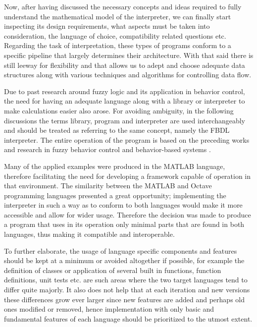 Now, after having discussed the necessary concepts and ideas required to fully understand the mathematical model of the interpreter, we can finally start inspecting its design requirements, what aspects must be taken into consideration, the language of choice, compatibility related questions etc. Regarding the task of interpretation, these types of programs conform to a specific pipeline that largely determines their architecture. With that said there is still leeway for flexibility and that allows us to adept and choose adequate data structures along with various techniques and algorithms for controlling data flow.

Due to past research around fuzzy logic and its application in behavior control, the need for having an adequate language along with a library or interpreter to make calculations easier also arose. For avoiding ambiguity, in the following discussions the terms library, program and interpreter are used interchangeably and should be treated as referring to the same concept, namely the FBDL interpreter. The entire operation of the program is based on the preceding works and research in fuzzy behavior control and behavior-based systems \cite{pillerkovacs2019}.

Many of the applied examples were produced in the MATLAB language, therefore facilitating the need for  developing a framework capable of operation in that environment. The similarity between the MATLAB and Octave programming languages presented a great opportunity; implementing the interpreter in such a way as to conform to both languages would make it more accessible and allow for wider usage. Therefore the decision was made to produce a program that uses in its operation only minimal parts that are found in both languages, thus making it compatible and interoperable.

To further elaborate, the usage of language specific components and features should be kept at a minimum or avoided altogether if possible, for example the definition of classes or application of several built in functions, function definitions, unit tests etc. are such areas where the two target languages tend to differ quite majorly. It also does not help that at each iteration and new versions these differences grow ever larger since new features are added and perhaps old ones modified or removed, hence implementation with only basic and fundamental features of each language should be prioritized to the utmost extent.


